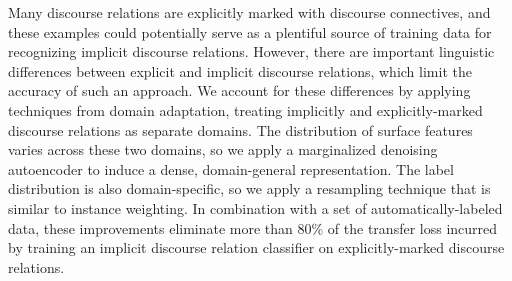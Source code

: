 Many discourse relations are explicitly marked with discourse connectives, and these examples could potentially serve as a plentiful source of training data for recognizing implicit discourse relations. However, there are important linguistic differences between explicit and implicit discourse relations, which limit the accuracy of such an approach. We account for these differences by applying techniques from domain adaptation, treating implicitly and explicitly-marked discourse relations as separate domains. The distribution of surface features varies across these two domains, so we apply a marginalized denoising autoencoder to induce a dense, domain-general representation. The label distribution is also domain-specific, so we apply a resampling technique that is similar to instance weighting. In combination with a set of automatically-labeled data, these improvements eliminate more than 80\% of the transfer loss incurred by training an implicit discourse relation classifier on explicitly-marked discourse relations.
